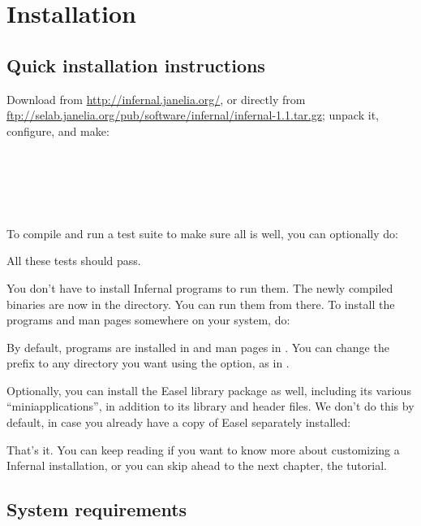 \section{Installation}
\label{section:installation}
\setcounter{footnote}{0}

\subsection{Quick installation instructions}

Download  from \url{http://infernal.janelia.org/}, or
directly from
\url{ftp://selab.janelia.org/pub/software/infernal/infernal-1.1.tar.gz};
unpack it, configure, and make:

\\
\\
\\
\\ 

To compile and run a test suite to make sure all is well, you can
optionally do:


All these tests should pass.

You don't have to install Infernal programs to run them. The newly
compiled binaries are now in the  directory. You can run
them from there. To install the programs and man pages somewhere on
your system, do:


By default, programs are installed in  and man
pages in . You can change the
 prefix to any directory you want using the
 option, as in .

Optionally, you can install the Easel library package as well,
including its various ``miniapplications'', in addition to its library
and header files. We don't do this by default, in case you already
have a copy of Easel separately installed:


That's it.  You can keep reading if you want to know more about
customizing a Infernal installation, or you can skip ahead to the next
chapter, the tutorial.

\subsection{System requirements}

